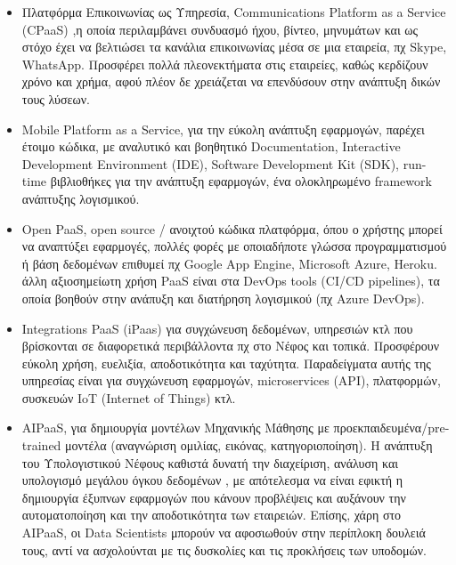 \documentclass{article}
\begin{document}
\begin{itemize}
\item Πλατφόρμα Επικοινωνίας ως Υπηρεσία, Communications Platform as a Service    (CPaaS) ,η οποία περιλαμβάνει συνδυασμό ήχου, βίντεο, μηνυμάτων και ως στόχο έχει να βελτιώσει τα κανάλια επικοινωνίας μέσα σε μια εταιρεία, πχ Skype, WhatsApp.
Προσφέρει πολλά πλεονεκτήματα στις εταιρείες, καθώς κερδίζουν χρόνο και χρήμα, αφού πλέον δε χρειάζεται να επενδύσουν στην ανάπτυξη δικών τους λύσεων.
\item {}Mobile Platform as a Service, για την εύκολη ανάπτυξη εφαρμογών, παρέχει έτοιμο κώδικα, με αναλυτικό και βοηθητικό Documentation, Interactive Development Environment (IDE), Software Development Kit (SDK), run-time βιβλιοθήκες για την ανάπτυξη εφαρμογών, ένα ολοκληρωμένο framework ανάπτυξης λογισμικού.
\item Open PaaS, open source / ανοιχτού κώδικα πλατφόρμα, όπου ο χρήστης μπορεί να αναπτύξει εφαρμογές, πολλές φορές με οποιαδήποτε γλώσσα προγραμματισμού ή βάση δεδομένων επιθυμεί πχ Google App Engine, Microsoft Azure, Heroku.
 άλλη αξιοσημείωτη χρήση  PaaS είναι στα DevOps tools (CI/CD pipelines), τα οποία βοηθούν στην ανάπυξη και διατήρηση λογισμικού (πχ Azure DevOps).
\item Integrations PaaS (iPaas) για συγχώνευση δεδομένων, υπηρεσιών κτλ που βρίσκονται σε διαφορετικά περιβάλλοντα πχ στο Νέφος και τοπικά. Προσφέρουν εύκολη χρήση, ευελιξία, αποδοτικότητα και ταχύτητα. Παραδείγματα αυτής της υπηρεσίας είναι για συγχώνευση εφαρμογών, microservices (API), πλατφορμών, συσκευών IoT (Internet of Things) κτλ.
\item {}AIPaaS, για δημιουργία μοντέλων Μηχανικής Μάθησης με προεκπαιδευμένα/pre-trained μοντέλα (αναγνώριση ομιλίας, εικόνας, κατηγοριοποίηση). Η ανάπτυξη του Υπολογιστικού Νέφους καθιστά δυνατή την διαχείριση, ανάλυση και υπολογισμό μεγάλου όγκου δεδομένων , με απότελεσμα να είναι εφικτή η δημιουργία έξυπνων εφαρμογών που κάνουν προβλέψεις και αυξάνουν την αυτοματοποίηση και την αποδοτικότητα των εταιρειών. Επίσης, χάρη στο AIPaaS, οι Data Scientists μπορούν να αφοσιωθούν στην περίπλοκη δουλειά τους, αντί να ασχολούνται με τις δυσκολίες και τις προκλήσεις των υποδομών.

\end{itemize}
\end{document}
